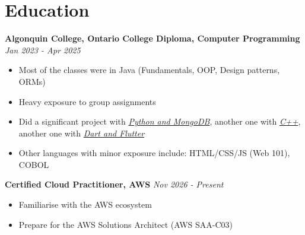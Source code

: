 \section{Education}

\textbf{Algonquin College, Ontario College Diploma, Computer Programming}
\hfill \textit{Jan 2023 - Apr 2025}
\begin{itemize}
    \item Most of the classes were in Java (Fundamentals, OOP, Design patterns, ORMs)
    \item Heavy exposure to group assignments
    \item Did a significant project with \href{https://github.com/Vitor-Curado/Python-website}{\textit{Python and MongoDB}}, another one with \href{https://github.com/Vitor-Curado/CST8002_LearningC_050_Vitor}{\textit{C++}}, another one with \href{https://github.com/Vitor-Curado/cheese_shoppe}{\textit{Dart and Flutter}}
    \item Other languages with minor exposure include: HTML/CSS/JS (Web 101), COBOL
\end{itemize}

\textbf{Certified Cloud Practitioner, AWS} 
\hfill \textit{Nov 2026 - Present}
\begin{itemize}
    \item Familiarise with the AWS ecosystem
    \item Prepare for the AWS Solutions Architect (AWS SAA-C03)
\end{itemize}